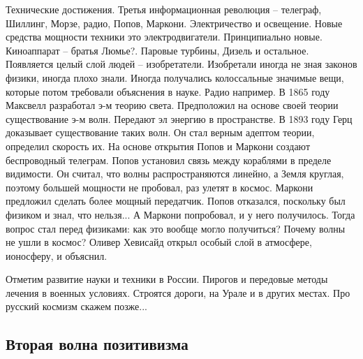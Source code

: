 \documentclass[a4paper, 12pt]{article}
\begin{document}
Технические достижения. Третья информационная революция -- телеграф, 
Шиллинг, Морзе, радио, Попов, Маркони. Электричество и освещение. Новые 
средства мощности техники это электродвигатели. Принципиально новые. 
Киноаппарат -- братья Люмье?. Паровые турбины, Дизель и остальное. 
Появляется целый слой людей -- изобретатели. Изобретали иногда не зная 
законов физики, иногда плохо знали. Иногда получались колоссальные 
значимые вещи, которые потом требовали объяснения в науке. Радио 
например. В 1865 году Максвелл разработал э-м теорию света. Предположил 
на основе своей теории существование э-м волн. Передают эл энергию 
в пространстве. В 1893 году Герц доказывает существование таких волн. Он 
стал верным адептом теории, определил скорость их. На основе открытия 
Попов и Маркони создают беспроводный телеграм. Попов установил связь 
между кораблями в пределе видимости. Он считал, что волны 
распространяются линейно, а Земля круглая, поэтому большей мощности не 
пробовал, раз улетят в космос. Маркони предложил сделать более мощный 
передатчик. Попов отказался, поскольку был физиком и знал, что нельзя... 
А Маркони попробовал, и у него получилось. Тогда вопрос стал перед 
физиками: как это вообще могло получиться? Почему волны не ушли 
в космос? Оливер Хевисайд открыл особый слой в атмосфере, ионосферу, 
и объяснил.

Отметим развитие науки и техники в России. Пирогов и передовые методы 
лечения в военных условиях. Строятся дороги, на Урале и в других местах. 
Про русский космизм скажем позже...


\subsection{Вторая волна позитивизма}
\end{document}
